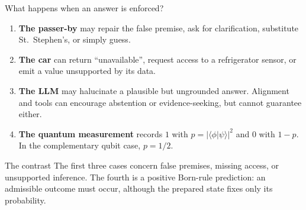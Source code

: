 \documentclass{beamer}
\begin{document}
\begin{frame}{What happens when an answer is enforced?}
\small
\begin{enumerate}
  \setlength{\itemsep}{0.55em}
  \item \textbf{The passer-by} may repair the false premise, ask for
        clarification, substitute St.~Stephen's, or simply guess.
  \item \textbf{The car} can return \enquote{unavailable}, request access to a
        refrigerator sensor, or emit a value unsupported by its data.
  \item \textbf{The LLM} may halucinate a plausible but ungrounded answer.
        Alignment and tools can encourage abstention or evidence-seeking, but
        cannot guarantee either.
  \item \textbf{The quantum measurement} records $1$ with
        $p=\lvert\langle\phi\vert\psi\rangle\rvert^2$ and $0$ with $1-p$.
        In the complementary qubit case, $p=1/2$.
\end{enumerate}

\begin{alertblock}{The contrast}
\footnotesize
The first three cases concern false premises, missing access, or unsupported
inference. The fourth is a positive Born-rule prediction: an admissible outcome
must occur, although the prepared state fixes only its probability.
\end{alertblock}
\end{frame}
\end{document}
